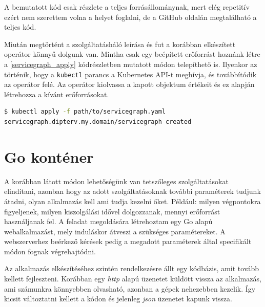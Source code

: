 A bemutatott kód csak részlete a teljes forrásállománynak, mert elég repetitív ezért nem szerettem volna a helyet foglalni, de a GitHub oldalán megtalálható a teljes kód. \\

\lstset{caption=Saját szolgáltatásháló definiálása, label=servicegraph_example}


Miután megtörtént a szolgáltatásháló leírása és fut a korábban elkészített operátor könnyű dolgunk van. Mintha csak egy beépített erőforrást hoznánk létre a \ref{servicegraph_apply} kódrészletben mutatott módon telepíthető is. 
Ilyenkor az történik, hogy a \verb+kubectl+ parancs a Kubernetes API-t meghívja, és továbbítódik az operátor felé. Az operátor kiolvassa a kapott objektum értékeit és ez alapján létrehozza a kívánt erőforrásokat. 

\lstset{caption=Szolgáltatásháló indítása, label=servicegraph_apply}
\begin{lstlisting}[language=bash,morekeywords={kubectl, apply},alsoletter={-},breaklines=true]
$ kubectl apply -f path/to/servicegraph.yaml                          
servicegraph.dipterv.my.domain/servicegraph created 
\end{lstlisting}


\section{Go konténer}
A korábban látott módon lehetőségünk van tetszőleges szolgáltatásokat elindítani, azonban hogy az adott szolgáltatásoknak további paraméterek tudjunk átadni, olyan alkalmazás kell ami tudja kezelni őket. Például: milyen végpontokra figyeljenek, milyen kiszolgálási idővel dolgozzanak, mennyi erőforrást használjanak fel.
A feladat megoldására létrehoztam egy Go alapú webalkalmazást, mely induláskor átveszi a szükséges paramétereket. A webszerverhez beérkező kérések pedig a megadott paraméterek által specifikált módon fognak végrehajtódni. 

Az alkalmazás elkészítéséhez szintén rendelkezésre állt egy kódbázis, amit tovább kellett fejleszteni. Korábban egy \textit{http} alapú üzenetet küldött vissza az alkalmazás, ami számunkra könnyebben olvasható, azonban a gépek nehezebben kezelik. Így kicsit változtatni kellett a kódon és jelenleg \textit{json} üzenetet kapunk vissza.

